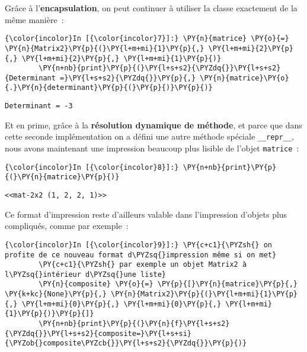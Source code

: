     Grâce à l'\textbf{encapsulation}, on peut continuer à utiliser la classe
exactement de la même manière~:

    \begin{Verbatim}[commandchars=\\\{\}]
{\color{incolor}In [{\color{incolor}7}]:} \PY{n}{matrice} \PY{o}{=} \PY{n}{Matrix2}\PY{p}{(}\PY{l+m+mi}{1}\PY{p}{,} \PY{l+m+mi}{2}\PY{p}{,} \PY{l+m+mi}{2}\PY{p}{,} \PY{l+m+mi}{1}\PY{p}{)}
        \PY{n+nb}{print}\PY{p}{(}\PY{l+s+s2}{\PYZdq{}}\PY{l+s+s2}{Determinant =}\PY{l+s+s2}{\PYZdq{}}\PY{p}{,} \PY{n}{matrice}\PY{o}{.}\PY{n}{determinant}\PY{p}{(}\PY{p}{)}\PY{p}{)}
\end{Verbatim}


    \begin{Verbatim}[commandchars=\\\{\}]
Determinant = -3

    \end{Verbatim}

    Et en prime, grâce à la \textbf{résolution dynamique de méthode}, et
parce que dans cette seconde implémentation on a défini une autre
méthode spéciale \texttt{\_\_repr\_\_}, nous avons maintenant une
impression beaucoup plus lisible de l'objet \texttt{matrice}~:

    \begin{Verbatim}[commandchars=\\\{\}]
{\color{incolor}In [{\color{incolor}8}]:} \PY{n+nb}{print}\PY{p}{(}\PY{n}{matrice}\PY{p}{)}
\end{Verbatim}


    \begin{Verbatim}[commandchars=\\\{\}]
<<mat-2x2 (1, 2, 2, 1)>>

    \end{Verbatim}

    Ce format d'impression reste d'ailleurs valable dans l'impression
d'objets plus compliqués, comme par exemple~:

    \begin{Verbatim}[commandchars=\\\{\}]
{\color{incolor}In [{\color{incolor}9}]:} \PY{c+c1}{\PYZsh{} on profite de ce nouveau format d\PYZsq{}impression même si on met}
        \PY{c+c1}{\PYZsh{} par exemple un objet Matrix2 à l\PYZsq{}intérieur d\PYZsq{}une liste}
        \PY{n}{composite} \PY{o}{=} \PY{p}{[}\PY{n}{matrice}\PY{p}{,} \PY{k+kc}{None}\PY{p}{,} \PY{n}{Matrix2}\PY{p}{(}\PY{l+m+mi}{1}\PY{p}{,} \PY{l+m+mi}{0}\PY{p}{,} \PY{l+m+mi}{0}\PY{p}{,} \PY{l+m+mi}{1}\PY{p}{)}\PY{p}{]}
        \PY{n+nb}{print}\PY{p}{(}\PY{n}{f}\PY{l+s+s2}{\PYZdq{}}\PY{l+s+s2}{composite=}\PY{l+s+si}{\PYZob{}composite\PYZcb{}}\PY{l+s+s2}{\PYZdq{}}\PY{p}{)}
\end{Verbatim}


